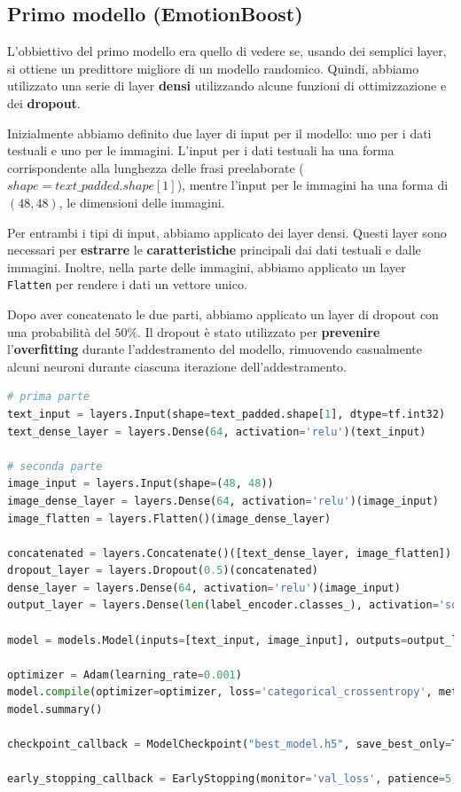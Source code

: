 \documentclass{article}
\begin{document}
\subsection{Primo modello (EmotionBoost)}
L'obbiettivo del primo modello era quello di vedere se, usando dei semplici layer, si ottiene un predittore migliore di un modello randomico. Quindi, abbiamo utilizzato una serie di layer \textbf{densi} utilizzando alcune funzioni di ottimizzazione e dei \textbf{dropout}.

\bigskip

Inizialmente abbiamo definito due layer di input per il modello: uno per i dati testuali e uno per le immagini. L'input per i dati testuali ha una forma corrispondente alla lunghezza delle frasi preelaborate ($shape=text\_padded.shape[1]$), mentre l'input per le immagini ha una forma di $(48, 48)$, le dimensioni delle immagini.

\bigskip

Per entrambi i tipi di input, abbiamo applicato dei layer densi. Questi layer sono necessari per \textbf{estrarre} le \textbf{caratteristiche} principali dai dati testuali e dalle immagini. Inoltre, nella parte delle immagini, abbiamo applicato un layer \verb|Flatten| per rendere i dati un vettore unico.

\bigskip

Dopo aver concatenato le due parti, abbiamo applicato un layer di dropout con una probabilità del $50\%$. Il dropout è stato utilizzato per \textbf{prevenire} l'\textbf{overfitting} durante l'addestramento del modello, rimuovendo casualmente alcuni neuroni durante ciascuna iterazione dell'addestramento.

\bigskip

\begin{lstlisting}[language=Python, caption=modello con soli layer densi]
# prima parte
text_input = layers.Input(shape=text_padded.shape[1], dtype=tf.int32)
text_dense_layer = layers.Dense(64, activation='relu')(text_input)

# seconda parte
image_input = layers.Input(shape=(48, 48))
image_dense_layer = layers.Dense(64, activation='relu')(image_input)
image_flatten = layers.Flatten()(image_dense_layer)

concatenated = layers.Concatenate()([text_dense_layer, image_flatten])
dropout_layer = layers.Dropout(0.5)(concatenated)
dense_layer = layers.Dense(64, activation='relu')(image_input)
output_layer = layers.Dense(len(label_encoder.classes_), activation='softmax')(dropout_layer)

model = models.Model(inputs=[text_input, image_input], outputs=output_layer)

optimizer = Adam(learning_rate=0.001)
model.compile(optimizer=optimizer, loss='categorical_crossentropy', metrics=['accuracy'])
model.summary()

checkpoint_callback = ModelCheckpoint("best_model.h5", save_best_only=True, monitor="val_accuracy", mode="max")

early_stopping_callback = EarlyStopping(monitor='val_loss', patience=5, restore_best_weights=True)
\end{lstlisting}
\end{document}
